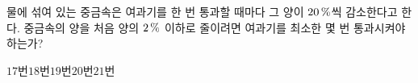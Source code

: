 물에 섞여 있는 중금속은 여과기를 한 번 통과할 때마다 그 양이 $20\mkern3mu \%$씩 감소한다고 한다. 중금속의 양을 처음 양의 $2\mkern3mu \%$ 이하로 줄이려면 여과기를 최소한 몇 번 통과시켜야 하는가? 
\begin{choices32}{$17$번}{$18$번}{$19$번}{$20$번}{$21$번}\end{choices32}
